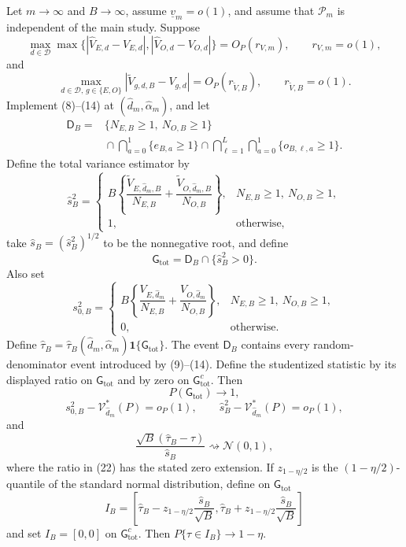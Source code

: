 Let \(m\to\infty\) and \(B\to\infty\), assume \(\underline v_m=o(1)\), and assume that \(\mathcal P_m\) is independent of the main study.  Suppose
\[
 \max_{d\in\mathcal D}\max\{|\widehat V_{E,d}-V_{E,d}|,
 |\widehat V_{O,d}-V_{O,d}|\}=O_P(r_{V,m}),
 \qquad r_{V,m}=o(1),                                      \tag{15}
\]
and
\[
 \max_{d\in\mathcal D,\,g\in\{E,O\}}
 |\widetilde V_{g,d,B}-V_{g,d}|=O_P(r_{\widetilde V,B}),
 \qquad r_{\widetilde V,B}=o(1).                           \tag{16}
\]
Implement (8)--(14) at \((\widehat d_m,\widehat\alpha_m)\), and let
\[
\begin{aligned}
 \mathsf D_B
 ={}&\{N_{E,B}\ge1,\ N_{O,B}\ge1\}\\
 &{}\cap\bigcap_{a=0}^1\{e_{B,a}\ge1\}
 \cap\bigcap_{\ell=1}^L\bigcap_{a=0}^1\{o_{B,\ell,a}\ge1\}.
\end{aligned}
\]
Define the total variance estimator by
\[
 \widehat s_B^2
 =\begin{cases}
 B\left\{\dfrac{\widetilde V_{E,\widehat d_m,B}}{N_{E,B}}
 +\dfrac{\widetilde V_{O,\widehat d_m,B}}{N_{O,B}}\right\},
 &N_{E,B}\ge1,\ N_{O,B}\ge1,\\[2mm]
 1,&\text{otherwise},
 \end{cases}                                                \tag{17}
\]
take \(\widehat s_B=(\widehat s_B^2)^{1/2}\) to be the nonnegative root, and define
\[
 \mathsf G_{\mathrm{tot}}
 =\mathsf D_B\cap\{\widehat s_B^2>0\}.                     \tag{18}
\]
Also set
\[
 s_{0,B}^2
 =\begin{cases}
 B\left\{\dfrac{V_{E,\widehat d_m}}{N_{E,B}}
 +\dfrac{V_{O,\widehat d_m}}{N_{O,B}}\right\},
 &N_{E,B}\ge1,\ N_{O,B}\ge1,\\[2mm]
 0,&\text{otherwise}.
 \end{cases}                                                \tag{19}
\]
Define \(\widehat\tau_B=\widehat\tau_B(\widehat d_m,\widehat\alpha_m)\mathbf 1\{\mathsf G_{\mathrm{tot}}\}\).  The event \(\mathsf D_B\) contains every random-denominator event introduced by (9)--(14).  Define the studentized statistic by its displayed ratio on \(\mathsf G_{\mathrm{tot}}\) and by zero on \(\mathsf G_{\mathrm{tot}}^c\).  Then
\[
 P(\mathsf G_{\mathrm{tot}})\longrightarrow1,               \tag{20}
\]
\[
 s_{0,B}^2-\mathcal V_{\widehat d_m}^*(P)=o_P(1),
 \qquad
 \widehat s_B^2-\mathcal V_{\widehat d_m}^*(P)=o_P(1),      \tag{21}
\]
and
\[
 \frac{\sqrt B(\widehat\tau_B-\tau)}{\widehat s_B}
 \rightsquigarrow\mathcal N(0,1),                           \tag{22}
\]
where the ratio in (22) has the stated zero extension.  If \(z_{1-\eta/2}\) is the \((1-\eta/2)\)-quantile of the standard normal distribution, define on \(\mathsf G_{\mathrm{tot}}\)
\[
 I_B=\left[
 \widehat\tau_B-z_{1-\eta/2}\frac{\widehat s_B}{\sqrt B},
 \widehat\tau_B+z_{1-\eta/2}\frac{\widehat s_B}{\sqrt B}
 \right]                                                    \tag{23}
\]
and set \(I_B=[0,0]\) on \(\mathsf G_{\mathrm{tot}}^c\).  Then \(P\{\tau\in I_B\}\to1-\eta\).